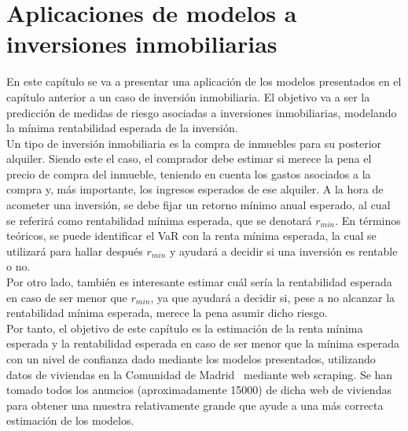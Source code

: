 \documentclass[11pt]{book}
\theoremstyle{plain} %
\theoremstyle{definition} %
\begin{document}
\chapter{Aplicaciones de modelos a inversiones inmobiliarias}

En este capítulo se va a presentar una aplicación de los modelos presentados en 
el capítulo anterior a un caso de inversión inmobiliaria. El objetivo va a ser la 
predicción de medidas de riesgo asociadas a inversiones inmobiliarias, modelando 
la mínima rentabilidad esperada de la inversión. \\

Un tipo de inversión inmobiliaria es la compra de inmuebles para su 
posterior alquiler. Siendo este el caso, el comprador debe estimar 
si merece la pena el precio de compra del inmueble, teniendo en 
cuenta los gastos asociados a la compra y, más importante, los ingresos 
esperados de ese alquiler. A la hora de acometer una inversión, se 
debe fijar un retorno mínimo anual esperado, al cual se referirá como 
rentabilidad mínima esperada, que se denotará $r_{min}$. En términos teóricos, 
se puede identificar el VaR con la renta mínima esperada, la cual 
se utilizará para hallar después $r_{min}$ y ayudará a decidir si 
una inversión es rentable o no. \\

Por otro lado, también es interesante estimar cuál sería la rentabilidad 
esperada en caso de ser menor que $r_{min}$, ya que ayudará a decidir 
si, pese a no alcanzar la rentabilidad mínima esperada, merece la pena asumir dicho riesgo. \\

Por tanto, el objetivo de este capítulo es la estimación de la renta
mínima esperada y la rentabilidad esperada en caso de ser menor 
que la mínima esperada con un nivel de confianza dado mediante los modelos presentados, utilizando datos 
de viviendas en la Comunidad de Madrid~\cite{ID25} mediante 
web scraping. Se han tomado 
todos los anuncios (aproximadamente 15000) de dicha web de viviendas para obtener una muestra 
relativamente grande que ayude a una más correcta estimación de los 
modelos. \\
\end{document}
